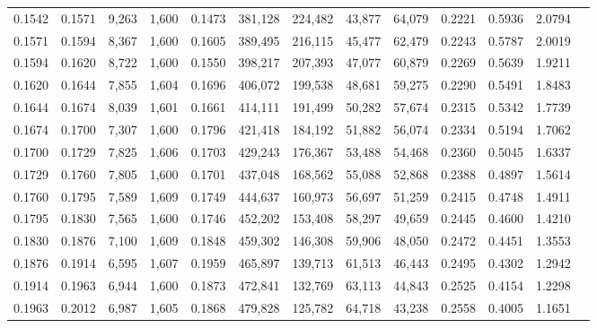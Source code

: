 \begin{tabular}{rrrrrrrrrrrrr}
0.1542 & 0.1571 &  9,263 & 1,600 &                                     0.1473 & 381,128 & 224,482 &  43,877 &  64,079 & 0.2221 & 0.5936 & 2.0794 \\
0.1571 & 0.1594 &  8,367 & 1,600 &                                     0.1605 & 389,495 & 216,115 &  45,477 &  62,479 & 0.2243 & 0.5787 & 2.0019 \\
0.1594 & 0.1620 &  8,722 & 1,600 &                                     0.1550 & 398,217 & 207,393 &  47,077 &  60,879 & 0.2269 & 0.5639 & 1.9211 \\
0.1620 & 0.1644 &  7,855 & 1,604 &                                     0.1696 & 406,072 & 199,538 &  48,681 &  59,275 & 0.2290 & 0.5491 & 1.8483 \\
0.1644 & 0.1674 &  8,039 & 1,601 &                                     0.1661 & 414,111 & 191,499 &  50,282 &  57,674 & 0.2315 & 0.5342 & 1.7739 \\
0.1674 & 0.1700 &  7,307 & 1,600 &                                     0.1796 & 421,418 & 184,192 &  51,882 &  56,074 & 0.2334 & 0.5194 & 1.7062 \\
0.1700 & 0.1729 &  7,825 & 1,606 &                                     0.1703 & 429,243 & 176,367 &  53,488 &  54,468 & 0.2360 & 0.5045 & 1.6337 \\
0.1729 & 0.1760 &  7,805 & 1,600 &                                     0.1701 & 437,048 & 168,562 &  55,088 &  52,868 & 0.2388 & 0.4897 & 1.5614 \\
0.1760 & 0.1795 &  7,589 & 1,609 &                                     0.1749 & 444,637 & 160,973 &  56,697 &  51,259 & 0.2415 & 0.4748 & 1.4911 \\
0.1795 & 0.1830 &  7,565 & 1,600 &                                     0.1746 & 452,202 & 153,408 &  58,297 &  49,659 & 0.2445 & 0.4600 & 1.4210 \\
0.1830 & 0.1876 &  7,100 & 1,609 &                                     0.1848 & 459,302 & 146,308 &  59,906 &  48,050 & 0.2472 & 0.4451 & 1.3553 \\
0.1876 & 0.1914 &  6,595 & 1,607 &                                     0.1959 & 465,897 & 139,713 &  61,513 &  46,443 & 0.2495 & 0.4302 & 1.2942 \\
0.1914 & 0.1963 &  6,944 & 1,600 &                                     0.1873 & 472,841 & 132,769 &  63,113 &  44,843 & 0.2525 & 0.4154 & 1.2298 \\
0.1963 & 0.2012 &  6,987 & 1,605 &                                     0.1868 & 479,828 & 125,782 &  64,718 &  43,238 & 0.2558 & 0.4005 & 1.1651 \\

\end{tabular}
